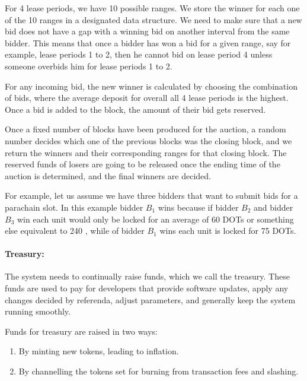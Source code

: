 For 4 lease periods, we have 10 possible ranges.
We store the winner for each one of the 10 ranges in a designated data structure.
We need to make sure that a new bid does not have a gap with a winning bid on another interval from the same bidder.
This means that once a bidder has won a bid for a given range, say for example, lease periods 1 to 2, then he cannot bid on lease period 4 unless someone overbids him for lease periods 1 to 2.

For any incoming bid, the new winner is calculated by choosing the combination of bids, where the average deposit for overall all 4 lease periods is the highest.
Once a bid is added to the block, the amount of their bid gets reserved.

Once a fixed number of blocks have been produced for the auction, a random number decides which one of the previous blocks was the closing block, and we return the winners and their corresponding ranges for that closing block.
The reserved funds of losers are going to be released once the ending time of the auction is determined, and the final winners are decided.

For example, let us assume we have three bidders that want to submit bids for a parachain slot.
In this example bidder $B_1$ wins because if bidder $B_2$ and bidder $B_3$ win each unit would only be locked for an average of 60 DOTs or something else equivalent to 240 , while of bidder $B_1$ wins each unit is locked for 75 DOTs.

 \paragraph{Treasury:}

 The system needs to continually raise funds, which we call the treasury.
 These funds are used to pay for developers that provide software updates, apply any changes decided by referenda, adjust parameters, and generally keep the system running smoothly.

Funds for treasury are raised in two ways:
\begin{enumerate}
\item By minting new tokens, leading to inflation.
\item By channelling the tokens set for burning from transaction fees and slashing.
\end{enumerate}
 
